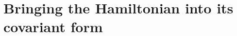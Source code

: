 \documentclass[
    10pt,
    aps,
    prb,
	longbibliography,
    twocolumn,
    floatfix,
    superscriptaddress,
]{revtex4-2}
\begin{document}




\section{Bringing the Hamiltonian into its covariant form}
\label{app:covariant_form}
\end{document}
